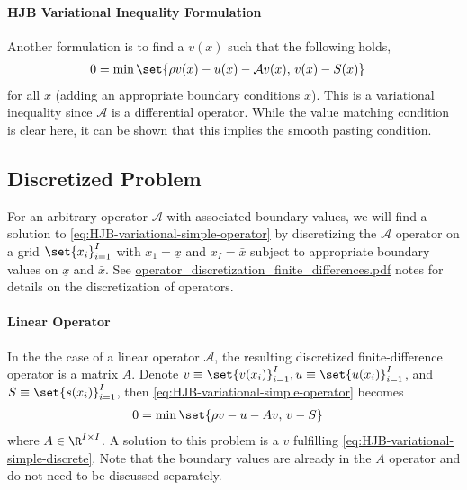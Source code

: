 \documentclass[11pt]{etk-article}
\begin{document}
\paragraph{HJB Variational Inequality Formulation}
Another formulation is to find a $v(x)$ such that the following holds,
\begin{align}
	0 &= \min\set{\rho v(x) - u(x) - \mathcal{A} v(x),\, v(x) - S(x) }\label{eq:HJB-variational-simple-operator}
\end{align}	
for all $x$ (adding an appropriate boundary conditions $x$).  This is a variational inequality since $\mathcal{A}$ is a differential operator.  While the value matching condition is clear here, it can be shown that this implies the smooth pasting condition.


\subsection{Discretized Problem}
For an arbitrary operator $\mathcal{A}$ with associated boundary values, we will find a solution to \cref{eq:HJB-variational-simple-operator} by discretizing the $\mathcal{A}$ operator on a grid $\set{x_i}_{i=1}^I$ with $x_1 = \underline{x}$ and $x_I = \bar{x}$ subject to appropriate boundary values on $\underline{x}$ and $\bar{x}$.  See \url{operator_discretization_finite_differences.pdf} notes for details on the discretization of operators.
\paragraph{Linear Operator}
In the the case of a linear operator $\mathcal{A}$, the resulting discretized finite-difference operator is a matrix $A$.  Denote $v \equiv \set{v(x_i)}_{i=1}^I, u \equiv \set{u(x_i)}_{i=1}^I$, and $S \equiv \set{s(x_i)}_{i=1}^I$, then \cref{eq:HJB-variational-simple-operator} becomes
\begin{align}
	0 &= \min\set{\rho v - u - A v,\, v - S }\label{eq:HJB-variational-simple-discrete}
\end{align}
where $A\in\R^{I\times I}$.  A solution to this problem is a $v$ fulfilling \cref{eq:HJB-variational-simple-discrete}.  Note that the boundary values are already in the $A$ operator and do not need to be discussed separately.
\end{document}
